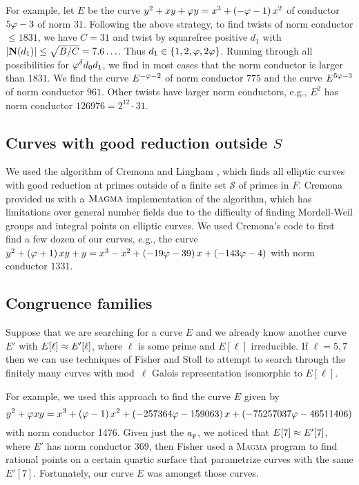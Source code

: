 \documentclass{amsart}
\begin{document}
For example, let $E$ be the curve $y^2 + xy + \varphi{}y = x^3 +
\left(-\varphi{} - 1\right)x^2 $ of conductor $5\varphi - 3$ of norm $31$.
Following the above strategy, to find twists of norm conductor $\leq
1831$, we have $C=31$ and twist by squarefree positive $d_1$ with
$|\mathbf{N}(d_1)| \leq \sqrt{B/C} = 7.6\ldots$.  Thus $d_1 \in \{1, 2,
\varphi, 2\varphi\}$.  Running through all possibilities for
$\varphi^{\delta} d_0 d_1$, we find in most cases that the norm
conductor is larger than $1831$.  We find the curve $E^{-\varphi-2}$ of
norm conductor $775$ and the curve $E^{5\varphi-3}$ of norm conductor
$961$.  Other twists have larger norm conductors, e.g., $E^2$ has norm
conductor $126976=2^{12}\cdot 31$.


\subsection{Curves with good reduction outside $S$}

We used the algorithm of Cremona and Lingham 
\cite{cremona-lingham}, which finds all elliptic curves with good
reduction at primes outside of a finite set $\mathcal{S}$ of primes in
$F$.  Cremona provided us with a $\textsc{Magma}$ implementation of
the algorithm, which has  limitations over general number
fields due to the difficulty of finding Mordell-Weil groups and
integral points on elliptic curves.  We used Cremona's code to first
find a few dozen of our curves, e.g., the curve $y^2 + \left(\varphi{} +
  1\right)xy + y = x^3 -x^2 + \left(-19 \varphi{} -
  39\right)x + \left(-143 \varphi{} - 4\right)$ with norm conductor $1331$.

\subsection{Congruence families}
Suppose that we are searching for a curve $E$ and we already know
another curve $E'$ with $E[\ell] \approx E'[\ell]$, where $\ell$ is
some prime and $E[\ell]$ irreducible.  If $\ell=5,7$ then we can use
techniques of Fisher and Stoll \cite{} to attempt to search through
the finitely many curves with mod~$\ell$ Galois representation
isomorphic to $E[\ell]$.

For example, we used this approach to find the curve $E$ given by
$$
y^2 + \varphi{}xy = x^3 + \left(\varphi{} - 1\right)x^2 + \left(-257364 \varphi{} - 159063\right)x + \left(-75257037 \varphi{} - 46511406\right)
$$
with norm conductor 1476.  Given just the $a_{\mathfrak{p}}$, we noticed that
$E[7] \approx E'[7]$, where $E'$ has norm conductor 369, then Fisher
used a \textsc{Magma} program to find rational points on a certain
quartic surface that parametrize curves with the same $E'[7]$.
Fortunately, our curve $E$ was amongst those curves.
\end{document}
